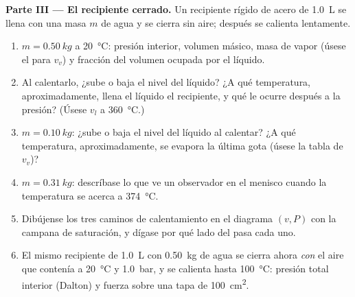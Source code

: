 \begin{problem}
\medskip
\noindent\textbf{Parte III --- El recipiente cerrado.}
Un recipiente rígido de acero de \qty{1.0}{L} se llena con una masa $m$ de
agua y se cierra sin aire; después se calienta lentamente.
\begin{enumerate}[resume]
  \item $m = \qty{0.50}{kg}$ a \qty{20}{\degreeCelsius}: presión interior,
        volumen másico, masa de vapor (úsese el  para $v_v$) y
        fracción del volumen ocupada por el líquido.
  \item Al calentarlo, ¿sube o baja el nivel del líquido? ¿A qué
        temperatura, aproximadamente, llena el líquido el recipiente, y
        qué le ocurre después a la presión? (Úsese $v_l$ a \qty{360}{\degreeCelsius}.)
  \item $m = \qty{0.10}{kg}$: ¿sube o baja el nivel del líquido al
        calentar? ¿A qué temperatura, aproximadamente, se evapora la
        última gota (úsese la tabla de $v_v$)?
  \item $m = \qty{0.31}{kg}$: descríbase lo que ve un observador en el
        menisco cuando la temperatura se acerca a \qty{374}{\degreeCelsius}.
  \item Dibújense los tres caminos de calentamiento en el diagrama
        $(v, P)$ con la campana de saturación, y dígase por qué lado del
         pasa cada uno.
  \item El mismo recipiente de \qty{1.0}{L} con \qty{0.50}{kg} de agua se
        cierra ahora \emph{con} el aire que contenía a \qty{20}{\degreeCelsius}
        y \qty{1.0}{bar}, y se calienta hasta \qty{100}{\degreeCelsius}:
        presión total interior (Dalton) y fuerza sobre una tapa de \qty{100}{cm^2}.
\end{enumerate}


\end{problem}
